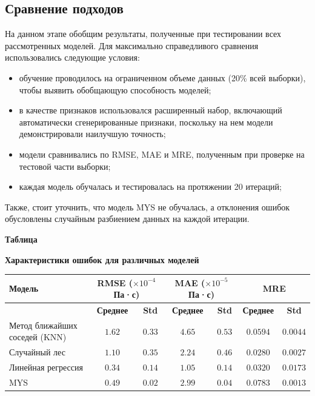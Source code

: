 \documentclass[a4paper,12pt]{article}
\newcommand{\TableNumberRight}{
  \refstepcounter{table}%
  \noindent\hfill\textbf{Таблица \thetable}
}
\begin{document}
  \subsection{Сравнение подходов}

    На данном этапе обобщим результаты, полученные при тестировании всех рассмотренных моделей. Для максимально справедливого сравнения использовались следующие условия:
    \begin{itemize}
      \item обучение проводилось на ограниченном объеме данных (20\% всей выборки), чтобы выявить обобщающую способность моделей;
      \item в качестве признаков использовался расширенный набор, включающий автоматически сгенерированные признаки, поскольку на нем модели демонстрировали наилучшую точность;
      \item модели сравнивались по RMSE, MAE и MRE, полученным при проверке на тестовой части выборки;
      \item каждая модель обучалась и тестировалась на протяжении 20 итераций;
    \end{itemize}

    Также, стоит уточнить, что модель MYS не обучалась, а отклонения ошибок обусловлены случайным разбиением данных на каждой итерации.

    \begin{table}[ht!]
      \TableNumberRight
      \begin{center}
        \textbf{Характеристики ошибок для различных моделей}
        \vspace*{\fill}
      \end{center}

      \vspace{0.8ex}
      \noindent
      \begin{tabular}{|l|c|c|c|c|c|c|}
          \hline
          \textbf{Модель} & \multicolumn{2}{c|}{\textbf{RMSE} (\(\times 10^{-4}\) Па·с)} & \multicolumn{2}{c|}{\textbf{MAE} (\(\times 10^{-5}\) Па·с)} & \multicolumn{2}{c|}{\textbf{MRE}} \\
          \hline
          & \textbf{Среднее} & \textbf{Std} & \textbf{Среднее} & \textbf{Std} & \textbf{Среднее} & \textbf{Std} \\
          \hline
          Метод ближайших соседей (KNN) & \( 1.62 \) & \( 0.33 \) & \( 4.65 \) & \( 0.53 \) & \( 0.0594 \) & \( 0.0044 \) \\
          Случайный лес                 & \( 1.10 \) & \( 0.35 \) & \( 2.24 \) & \( 0.46 \) & \( 0.0280 \) & \( 0.0027 \) \\
          Линейная регрессия            & \( 0.34 \) & \( 0.14 \) & \( 1.05 \) & \( 0.14 \) & \( 0.0320 \) & \( 0.0173 \) \\
          MYS                           & \( 0.49 \) & \( 0.02 \) & \( 2.99 \) & \( 0.04 \) & \( 0.0783 \) & \( 0.0013 \) \\
          \hline
      \end{tabular}

      \label{tab:model_comparison}
\end{table}
\end{document}
